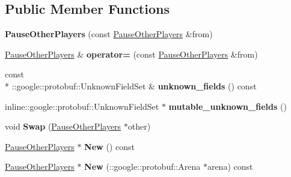 \subsection*{Public Member Functions}
\begin{DoxyCompactItemize}
\item 
\hypertarget{class_pause_other_players_a27bbeda44b6b6e905276c0a6a5f38702}{{\bfseries Pause\-Other\-Players} (const \hyperlink{class_pause_other_players}{Pause\-Other\-Players} \&from)}\label{class_pause_other_players_a27bbeda44b6b6e905276c0a6a5f38702}

\item 
\hypertarget{class_pause_other_players_aa77bc93b6bccd761f4360c56b784e1aa}{\hyperlink{class_pause_other_players}{Pause\-Other\-Players} \& {\bfseries operator=} (const \hyperlink{class_pause_other_players}{Pause\-Other\-Players} \&from)}\label{class_pause_other_players_aa77bc93b6bccd761f4360c56b784e1aa}

\item 
\hypertarget{class_pause_other_players_a4b909a26d8345e6efbaac4a18d97cc27}{const \\*
\-::google\-::protobuf\-::\-Unknown\-Field\-Set \& {\bfseries unknown\-\_\-fields} () const }\label{class_pause_other_players_a4b909a26d8345e6efbaac4a18d97cc27}

\item 
\hypertarget{class_pause_other_players_a1736e5ae730a67ca4d70a7a7fb252f09}{inline\-::google\-::protobuf\-::\-Unknown\-Field\-Set $\ast$ {\bfseries mutable\-\_\-unknown\-\_\-fields} ()}\label{class_pause_other_players_a1736e5ae730a67ca4d70a7a7fb252f09}

\item 
\hypertarget{class_pause_other_players_a197ba9c7116c63439e83c9365ceb57e0}{void {\bfseries Swap} (\hyperlink{class_pause_other_players}{Pause\-Other\-Players} $\ast$other)}\label{class_pause_other_players_a197ba9c7116c63439e83c9365ceb57e0}

\item 
\hypertarget{class_pause_other_players_a7732cb5a8cfb74cd10d5ef5003860ee8}{\hyperlink{class_pause_other_players}{Pause\-Other\-Players} $\ast$ {\bfseries New} () const }\label{class_pause_other_players_a7732cb5a8cfb74cd10d5ef5003860ee8}

\item 
\hypertarget{class_pause_other_players_a35ff08f92a7f3996646b99ea055ca8dc}{\hyperlink{class_pause_other_players}{Pause\-Other\-Players} $\ast$ {\bfseries New} (\-::google\-::protobuf\-::\-Arena $\ast$arena) const }\label{class_pause_other_players_a35ff08f92a7f3996646b99ea055ca8dc}


\end{DoxyCompactItemize}
